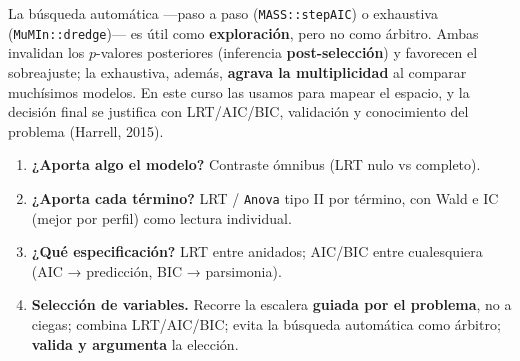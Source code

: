 \documentclass[
  letterpaper,
  DIV=11,
  numbers=noendperiod]{scrartcl}
\providecommand{\tightlist}{%
  \setlength{\itemsep}{0pt}\setlength{\parskip}{0pt}}\usepackage{longtable,booktabs,array}
\begin{document}
\begin{tcolorbox}[enhanced jigsaw, coltitle=black, rightrule=.15mm, arc=.35mm, leftrule=.75mm, colback=white, colbacktitle=quarto-callout-warning-color!10!white, left=2mm, breakable, toptitle=1mm, toprule=.15mm, bottomtitle=1mm, titlerule=0mm, title=\textcolor{quarto-callout-warning-color}{\faExclamationTriangle}\hspace{0.5em}{Sobre la selección automática (\texttt{step}, \texttt{dredge})}, bottomrule=.15mm, opacityback=0, opacitybacktitle=0.6, colframe=quarto-callout-warning-color-frame]

La búsqueda automática ---paso a paso (\texttt{MASS::stepAIC}) o
exhaustiva (\texttt{MuMIn::dredge})--- es útil como
\textbf{exploración}, pero no como árbitro. Ambas invalidan los
\(p\)-valores posteriores (inferencia \textbf{post-selección}) y
favorecen el sobreajuste; la exhaustiva, además, \textbf{agrava la
multiplicidad} al comparar muchísimos modelos. En este curso las usamos
para mapear el espacio, y la decisión final se justifica con
LRT/AIC/BIC, validación y conocimiento del problema (Harrell, 2015).

\end{tcolorbox}

\begin{tcolorbox}[enhanced jigsaw, coltitle=black, rightrule=.15mm, arc=.35mm, leftrule=.75mm, colback=white, colbacktitle=quarto-callout-tip-color!10!white, left=2mm, breakable, toptitle=1mm, toprule=.15mm, bottomtitle=1mm, titlerule=0mm, title=\textcolor{quarto-callout-tip-color}{\faLightbulb}\hspace{0.5em}{Protocolo de inferencia y selección}, bottomrule=.15mm, opacityback=0, opacitybacktitle=0.6, colframe=quarto-callout-tip-color-frame]

\begin{enumerate}
\def\labelenumi{\arabic{enumi}.}
\tightlist
\item
  \textbf{¿Aporta algo el modelo?} Contraste ómnibus (LRT nulo vs
  completo).
\item
  \textbf{¿Aporta cada término?} LRT / \texttt{Anova} tipo II por
  término, con Wald e IC (mejor por perfil) como lectura individual.
\item
  \textbf{¿Qué especificación?} LRT entre anidados; AIC/BIC entre
  cualesquiera (AIC → predicción, BIC → parsimonia).
\item
  \textbf{Selección de variables.} Recorre la escalera \textbf{guiada
  por el problema}, no a ciegas; combina LRT/AIC/BIC; evita la búsqueda
  automática como árbitro; \textbf{valida y argumenta} la elección.
\end{enumerate}

\end{tcolorbox}
\end{document}
